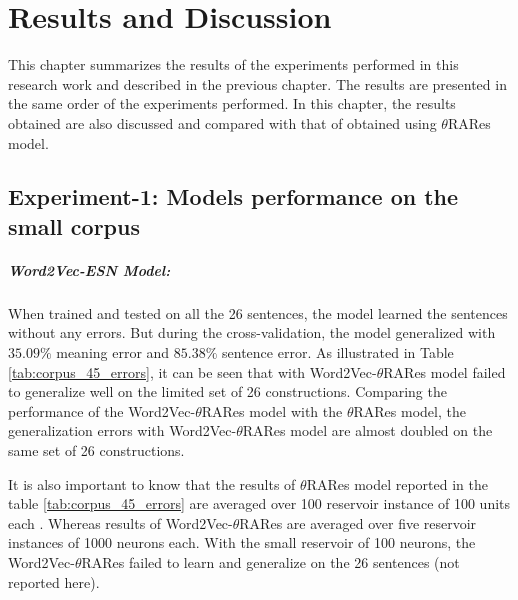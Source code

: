 \chapter{Results and Discussion}\label{results}

This chapter summarizes the results of the experiments performed in this research work and described in the previous chapter. The results are presented in the same order of the experiments performed. In this chapter, the results obtained are also discussed and compared with that of obtained using $\theta$RARes model. 

\section{Experiment-1: Models performance on the small corpus}

\paragraph{Word2Vec-ESN Model:} When trained and tested on all the 26 sentences, the model learned the sentences without any errors. But during the cross-validation, the model generalized with $35.09\%$ meaning error and $85.38\%$ sentence error. As illustrated in Table \ref{tab:corpus_45_errors}, it can be seen that with Word2Vec-$\theta$RARes model failed to generalize well on the limited set of 26 constructions. Comparing the performance of the Word2Vec-$\theta$RARes model with the $\theta$RARes model, the generalization errors with Word2Vec-$\theta$RARes model are almost doubled on the same set of 26 constructions. 

It is also important to know that the results of $\theta$RARes model reported in the table \ref{tab:corpus_45_errors} are averaged over 100 reservoir instance of 100 units each \cite{xavier:2013:RT}. Whereas results of Word2Vec-$\theta$RARes are averaged over five reservoir instances of 1000 neurons each. With the small reservoir of 100 neurons, the Word2Vec-$\theta$RARes failed to learn and generalize on the 26 sentences (not reported here).

